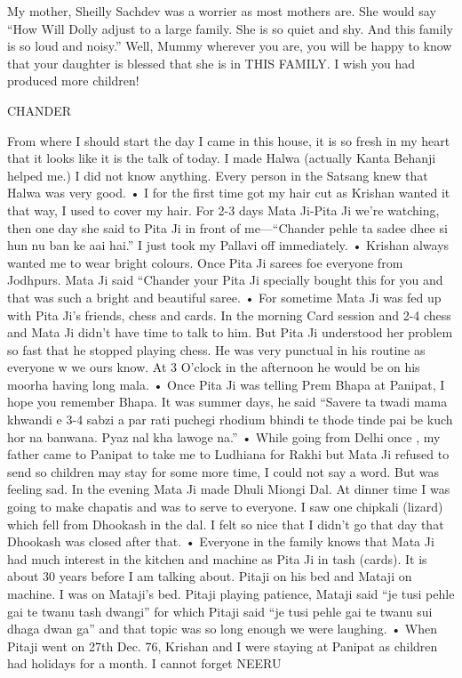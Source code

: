 My mother, Sheilly Sachdev was a worrier as most mothers are. She would say “How Will Dolly adjust to a large family. She is so quiet and shy. And this family is so loud and noisy.” Well, Mummy wherever you are, you will be happy to know that your daughter is blessed that she is in THIS FAMILY. I wish you had produced more children! 


CHANDER

From where I should start the day I came in this house, it is so fresh in my heart that it looks like it is the talk of today. I made Halwa (actually Kanta Behanji helped me.) I did not know anything. Every person in the Satsang knew that Halwa was very good. 
•	I for the first time got my hair cut as Krishan wanted it that way, I used to cover my hair. For 2-3 days Mata Ji-Pita Ji we’re watching, then one day she said to Pita Ji in front of me—“Chander pehle ta sadee dhee si hun nu ban ke aai hai.” I just took my Pallavi off immediately. 
•	Krishan always wanted me to wear bright colours. Once Pita Ji sarees foe everyone from Jodhpurs. Mata Ji said “Chander your Pita Ji specially bought this for you and that was such a bright and beautiful saree. 
•	For sometime Mata Ji was fed up with Pita Ji’s friends, chess and cards. In the morning Card session and 2-4 chess and Mata Ji didn’t have time to talk to him. But Pita Ji understood her problem so fast that he stopped playing chess. He was very punctual in his routine as everyone w we ours know. At 3 O’clock in the afternoon he would be on his moorha having long mala. 
•	Once Pita Ji was telling Prem Bhapa at Panipat, I hope you remember Bhapa. It was summer days, he said “Savere ta twadi mama khwandi e 3-4 sabzi a par rati puchegi rhodium bhindi te thode tinde pai be kuch hor na banwana. Pyaz nal kha lawoge na.”
•	While going from Delhi once , my father came to Panipat to take me to Ludhiana for Rakhi but Mata Ji refused to send so children may stay for some more time, I could not say a word. But was feeling sad. In the evening Mata Ji made Dhuli Miongi Dal. At dinner time I was going to make chapatis and was to serve to everyone. I saw one chipkali (lizard) which fell from Dhookash in the dal. I felt so nice that I didn’t go that day that Dhookash was closed after that. 
•	Everyone in the family knows that Mata Ji had much interest in the kitchen and machine as Pita Ji in tash (cards). It is about 30 years before I am talking about. Pitaji on his bed and Mataji on machine. I was on Mataji’s bed. Pitaji playing patience, Mataji said “je tusi pehle gai te twanu tash dwangi” for which Pitaji said “je tusi pehle gai te twanu sui dhaga dwan ga” and that topic was so long enough we were laughing. 
•	When Pitaji went on 27th Dec. 76, Krishan and I were staying at Panipat as children had holidays for a month. I cannot forget 
NEERU

